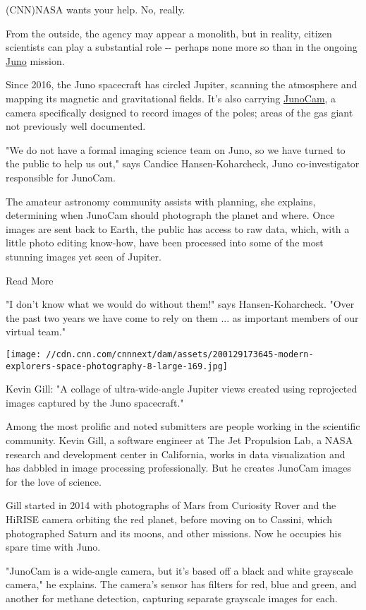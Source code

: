 (CNN)NASA wants your help. No, really.

From the outside, the agency may appear a monolith, but in reality,
citizen scientists can play a substantial role -\/- perhaps none more so
than in the ongoing
\href{https://www.nasa.gov/mission_pages/juno/overview/index.html}{Juno}
mission.

Since 2016, the Juno spacecraft has circled Jupiter, scanning the
atmosphere and mapping its magnetic and gravitational fields. It's also
carrying
\href{https://www.missionjuno.swri.edu/spacecraft/juno-spacecraft}{JunoCam},
a camera specifically designed to record images of the poles; areas of
the gas giant not previously well documented.

"We do not have a formal imaging science team on Juno, so we have turned
to the public to help us out," says Candice Hansen-Koharcheck, Juno
co-investigator responsible for JunoCam.

The amateur astronomy community assists with planning, she explains,
determining when JunoCam should photograph the planet and where. Once
images are sent back to Earth, the public has access to raw data, which,
with a little photo editing know-how, have been processed into some of
the most stunning images yet seen of Jupiter.

Read More

"I don't know what we would do without them!" says Hansen-Koharcheck.
"Over the past two years we have come to rely on them ... as important
members of our virtual team."

\texttt{[image: //cdn.cnn.com/cnnnext/dam/assets/200129173645-modern-explorers-space-photography-8-large-169.jpg]}

Kevin Gill: "A collage of ultra-wide-angle Jupiter views created using
reprojected images captured by the Juno spacecraft."

Among the most prolific and noted submitters are people working in the
scientific community. Kevin Gill, a software engineer at The Jet
Propulsion Lab, a NASA research and development center in California,
works in data visualization and has dabbled in image processing
professionally. But he creates JunoCam images for the love of science.

Gill started in 2014 with photographs of Mars from Curiosity Rover and
the HiRISE camera orbiting the red planet, before moving on to Cassini,
which photographed Saturn and its moons, and other missions. Now he
occupies his spare time with Juno.

"JunoCam is a wide-angle camera, but it's based off a black and white
grayscale camera," he explains. The camera's sensor has filters for red,
blue and green, and another for methane detection, capturing separate
grayscale images for each.

